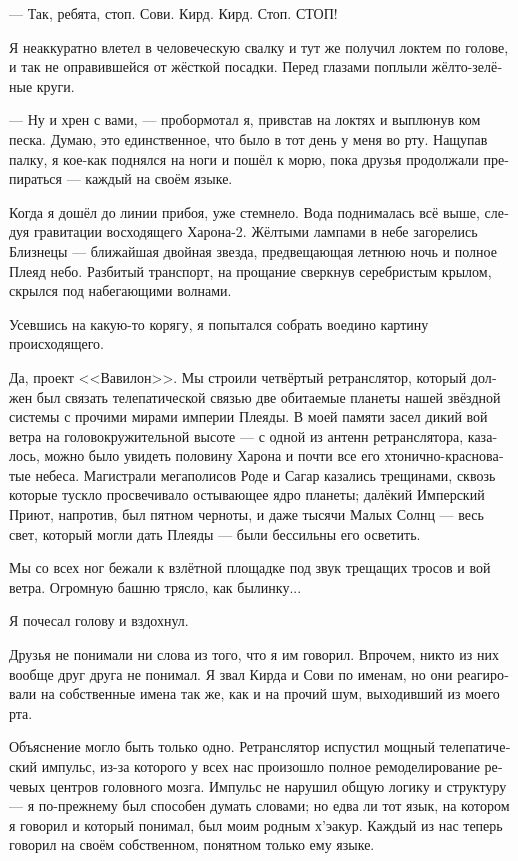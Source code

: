 \documentclass[a4paper,10pt,fleqn]{book}\usepackage{polyglossia}\setdefaultlanguage[babelshorthands=true]{russian}\setotherlanguage{english}\defaultfontfeatures{Ligatures=TeX,Mapping=tex-text}
\newcommand{\asterism}{\vspace{1em}{\centering\Large\bfseries$\ast~\ast~\ast$\par}\vspace{1em}}
\begin{document}
--- Так, ребята, стоп.
Сови.
Кирд.
Кирд.
Стоп.
СТОП!

Я неаккуратно влетел в человеческую свалку и тут же получил локтем по голове, и так не оправившейся от жёсткой посадки.
Перед глазами поплыли жёлто-зелёные круги.

--- Ну и хрен с вами, --- пробормотал я, привстав на локтях и выплюнув ком песка.
Думаю, это единственное, что было в тот день у меня во рту.
Нащупав палку, я кое-как поднялся на ноги и пошёл к морю, пока друзья продолжали препираться --- каждый на своём языке.

Когда я дошёл до линии прибоя, уже стемнело.
Вода поднималась всё выше, следуя гравитации восходящего Харона-2.
Жёлтыми лампами в небе загорелись Близнецы --- ближайшая двойная звезда, предвещающая летнюю ночь и полное Плеяд небо.
Разбитый транспорт, на прощание сверкнув серебристым крылом, скрылся под набегающими волнами.

\asterism

Усевшись на какую-то корягу, я попытался собрать воедино картину происходящего.

Да, проект <<Вавилон>>.
Мы строили четвёртый ретранслятор, который должен был связать телепатической связью две обитаемые планеты нашей звёздной системы с прочими мирами империи Плеяды.
В моей памяти засел дикий вой ветра на головокружительной высоте --- с одной из антенн ретранслятора, казалось, можно было увидеть половину Харона и почти все его хтонично-красноватые небеса.
Магистрали мегаполисов Роде и Сагар казались трещинами, сквозь которые тускло просвечивало остывающее ядро планеты;
далёкий Имперский Приют, напротив, был пятном черноты, и даже тысячи Малых Солнц --- весь свет, который могли дать Плеяды --- были бессильны его осветить.

Мы со всех ног бежали к взлётной площадке под звук трещащих тросов и вой ветра.
Огромную башню трясло, как былинку...

Я почесал голову и вздохнул.

Друзья не понимали ни слова из того, что я им говорил.
Впрочем, никто из них вообще друг друга не понимал.
Я звал Кирда и Сови по именам, но они реагировали на собственные имена так же, как и на прочий шум, выходивший из моего рта.

Объяснение могло быть только одно.
Ретранслятор испустил мощный телепатический импульс, из-за которого у всех нас произошло полное ремоделирование речевых центров головного мозга.
Импульс не нарушил общую логику и структуру --- я по-прежнему был способен думать словами;
но едва ли тот язык, на котором я говорил и который понимал, был моим родным х'эакур.
Каждый из нас теперь говорил на своём собственном, понятном только ему языке.
\end{document}
